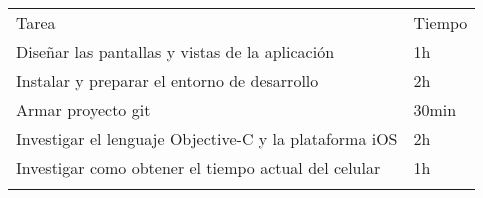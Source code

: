 \begin{enumerate}
  \begin{longtable}[c]{@{}ll@{}}
  \hline\noalign{\medskip}
  \begin{minipage}[b]{0.92\columnwidth}\raggedright
  Tarea
  \end{minipage} & \begin{minipage}[b]{0.08\columnwidth}\raggedright
  Tiempo
  \end{minipage}
  \\\noalign{\medskip}
  \hline\noalign{\medskip}
  \begin{minipage}[t]{0.92\columnwidth}\raggedright
  Diseñar las pantallas y vistas de la aplicación
  \end{minipage} & \begin{minipage}[t]{0.08\columnwidth}\raggedright
  1h
  \end{minipage}
  \\\noalign{\medskip}
  \begin{minipage}[t]{0.92\columnwidth}\raggedright
  Instalar y preparar el entorno de desarrollo
  \end{minipage} & \begin{minipage}[t]{0.08\columnwidth}\raggedright
  2h
  \end{minipage}
  \\\noalign{\medskip}
  \begin{minipage}[t]{0.92\columnwidth}\raggedright
  Armar proyecto git
  \end{minipage} & \begin{minipage}[t]{0.08\columnwidth}\raggedright
  30min
  \end{minipage}
  \\\noalign{\medskip}
  \begin{minipage}[t]{0.92\columnwidth}\raggedright
  Investigar el lenguaje Objective-C y la plataforma iOS
  \end{minipage} & \begin{minipage}[t]{0.08\columnwidth}\raggedright
  2h
  \end{minipage}
  \\\noalign{\medskip}
  \begin{minipage}[t]{0.92\columnwidth}\raggedright
  Investigar como obtener el tiempo actual del celular
  \end{minipage} & \begin{minipage}[t]{0.08\columnwidth}\raggedright
  1h
  \end{minipage}
  \\\noalign{\medskip}
  \begin{minipage}[t]{0.92\columnwidth}\raggedright

\end{minipage}
\end{longtable}
\end{enumerate}
